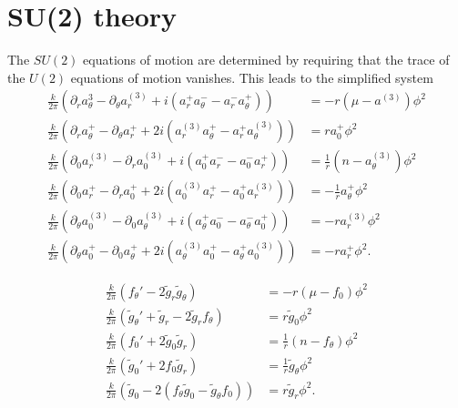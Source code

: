 \section{SU(2) theory}

The $SU(2)$ equations of motion are determined by requiring that the trace of the $U(2)$ equations of motion vanishes. This leads to the simplified system
    \begin{align}
        \frac{k}{2 \pi} \left(\partial_{r} a_{\theta}^3 - \partial_{\theta} a_r^{(3)} + i \left(a_r^+ a_{\theta}^- - a_r^- a_{\theta}^{+} \right) \right) &= -r \left(\mu - a^{(3)} \right)\phi^2 \\
        \frac{k}{2 \pi} \left(\partial_r a_{\theta}^{+} - \partial_{\theta} a_r^{+} +2i \left(a_r^{(3)} a_{\theta}^{+} - a_r^{+} a_{\theta}^{(3)} \right) \right) &=r a_0^{+} \phi^2  \\
        \frac{k}{2 \pi}\left(\partial_{0}a_r^{(3)} - \partial_r a_0^{(3)} + i \left(a_0^+ a_r^- - a_0^- a_r^+  \right)  \right) &= \frac{1}{r} \left(n - a_{\theta}^{(3)} \right) \phi^2  \\
        \frac{k}{2 \pi} \left( \partial_0 a_r^+ - \partial_r a_0^+ + 2i \left( a_0^{(3)} a_r^+ -a_0^+ a_r^{(3)} \right) \right) &= -\frac{1}{r} a_{\theta}^+ \phi^2  \\
        \frac{k}{2 \pi} \left(\partial_{\theta} a_0^{(3)} - \partial_0 a_{\theta}^{(3)} + i \left(a_{\theta}^+ a_0^- - a_{\theta}^- a_0^{+} \right) \right) &= -r  a_r^{(3)} \phi^2 \\
        \frac{k}{2 \pi} \left(\partial_{\theta} a_0^+ - \partial_0 a_{\theta}^+ + 2i \left(a_{\theta}^{(3)} a_0^+ - a_{\theta}^+ a_0^{(3)} \right) \right) &=-r a_r^+ \phi^2.
    \end{align}




    \begin{align}
        \frac{k}{2 \pi } \left(f_{\theta}' - 2\tilde{g}_r \tilde{g}_{\theta}\right) &= -r \left(\mu - f_0\right) \phi^2\\
        \frac{k}{2 \pi} \left(\tilde{g}_{\theta}' + \tilde{g}_r - 2 \tilde{g}_r f_{\theta} \right) & = r\tilde{g}_0 \phi^2 \\
        \frac{k}{2\pi} \left(f_0'+2 \tilde{g}_0\tilde{g}_r\right) &= \frac{1}{r} \left(n - f_{\theta}\right)\phi^2 \\
        \frac{k}{2\pi}\left(\tilde{g}_0' + 2 f_0 \tilde{g}_r \right) &=\frac{1}{r} \tilde{g}_{\theta}\phi^2 \\
        \frac{k}{2\pi} \left(\tilde{g}_0 - 2\left(f_{\theta} \tilde{g}_0 - \tilde{g}_{\theta} f_0\right)\right) &= r \tilde{g}_r \phi^2.
    \end{align}


